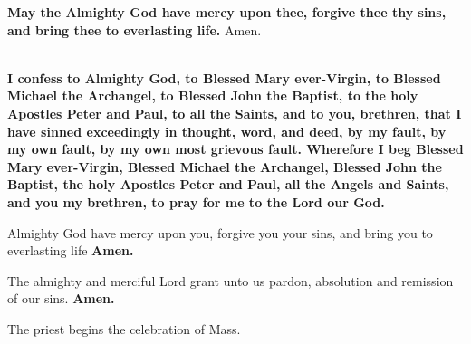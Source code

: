 \textbf{May the Almighty God have mercy upon thee, forgive thee thy sins, and
bring thee to everlasting life.}
Amen.

\\
\textbf{I confess to Almighty God, to Blessed Mary ever-Virgin, to Blessed Michael
the Archangel, to Blessed John the Baptist, to the holy Apostles Peter and
Paul, to all the Saints, and to you, brethren, that I have sinned exceedingly in
thought, word, and deed, by my fault, by my own fault, by my own most
grievous fault. Wherefore I beg Blessed Mary ever-Virgin, Blessed Michael
the Archangel, Blessed John the Baptist, the holy Apostles Peter and Paul, all
the Angels and Saints, and you my brethren, to pray for me to the Lord our
God.}

Almighty God have mercy upon you, forgive you your sins, and bring you to
everlasting life \textbf{Amen.}

\cross The almighty and merciful Lord grant unto us pardon, absolution and
remission of our sins. \textbf{Amen.}


\begin{rubric}
The priest begins the celebration of Mass.
\end{rubric}

\clearpage
